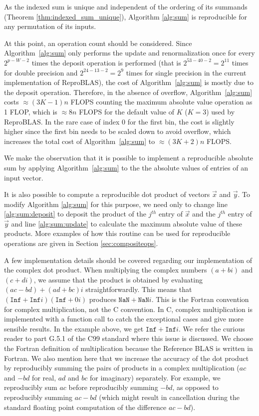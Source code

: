     As the indexed sum is unique and independent of the ordering of its summands (Theorem \ref{thm:indexed_sum_unique}), Algorithm \ref{alg:sum} is reproducible for any permutation of its inputs.

    At this point, an operation count should be considered. Since Algorithm~\ref{alg:sum} only performs the update and renormalization
  once for every $2^{p-W-2}$ times the deposit operation is performed (that
is $2^{53-40-2}=2^{11}$ times for double precision and $2^{24-13-2} = 2^9$ times for single precision in the current implementation of
  ReproBLAS), the cost of Algorithm~\ref{alg:sum} is mostly due to the
  deposit operation.
  Therefore, in the absence of overflow, Algorithm~\ref{alg:sum} costs
  $\approx (3K-1)n$ FLOPS counting the maximum absolute value operation as 1 FLOP,
  which is $\approx 8n$ FLOPS for the default value of $K$ ($K=3$) used by ReproBLAS.
  In the rare case of index 0 for the first bin,
  the cost is slightly higher since the first bin
  needs to be scaled down to avoid overflow, which increases the
  total cost of Algorithm~\ref{alg:sum} to $\approx (3K+2)n$ FLOPS.

  We make the observation that it is possible to implement a reproducible absolute sum by applying Algorithm~\ref{alg:sum} to the the absolute values of entries of an input vector.

  It is also possible to compute a reproducible dot product of vectors $\vec{x}$ and $\vec{y}$. To modify Algorithm \ref{alg:sum} for this purpose, we need only to change line  \ref{alg:sum:deposit} to deposit the product of the $j^{th}$ entry of $\vec{x}$ and the $j^{th}$ entry of $\vec{y}$ and line \ref{alg:sum:update} to calculate the maximum absolute value of these products. More examples of how this routine can be used for reproducible operations are given in Section \ref{sec:compositeops}.

  A few implementation details should be covered regarding our implementation of the complex dot product. When multiplying the complex numbers $(a + bi)$ and $(c + di)$, we assume that the product is obtained by evaluating $(ac - bd) + (ad + bc)i$ straightforwardly. This means that $(\texttt{Inf} + \texttt{Inf}i)(\texttt{Inf} + 0i)$ produces $\texttt{NaN} + \texttt{NaN}i$.
  This is the Fortran convention for complex multiplication, not the C convention. In C, complex multiplication is implemented with a function call to catch the exceptional cases and give more sensible results. In the example above, we get $\texttt{Inf} + \texttt{Inf}i$. We refer the curious reader to part G.5.1 of the C99 standard \cite{c99} where this issue is discussed. We choose the Fortran definition of multiplication because the Reference BLAS is written in Fortran. We also mention here that we increase the accuracy of the dot product by reproducibly summing the pairs of products in a complex multiplication ($ac$ and $-bd$ for real, $ad$ and $bc$ for imaginary) separately. For example, we reproducibly sum $ac$ before reproducibly summing $-bd$, as opposed to reproducibly summing $ac - bd$ (which might result in cancellation during the standard floating point computation of the difference $ac - bd$).




